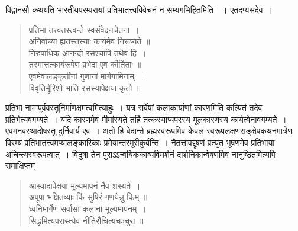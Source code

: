 {\dev विद्वानसौ कथयति भारतीयपरम्परायां प्रतिभातत्त्वविवेचनं न सम्यगभिहितमिति}~{\dev~। एतदप्यसदेव~।}
\begin{quote}
{\dev प्रतिभा तत्त्वतस्त्वन्ते स्वसंवेदनचेतना~।}\\
{\dev अनिर्वाच्या ह्यतस्तस्याः कार्यमेव निरूप्यते ॥}\\[5pt]
{\dev निरुपाधिक आनन्दो रसश्चापि तथैव हि~।}\\
{\dev तस्मात्तत्कार्यरूपेण प्रभेदा एव कीर्तिताः ॥}\\[5pt]
{\dev एवमेवालङ्कृतीनां गुणानां मार्गगामिनाम्~।}\\
{\dev विवृतिर्भूरिशो भाति रसस्यापेक्षया कृतौ ॥}
\end{quote}

{\dev प्रतिभा नामापूर्ववस्तुनिर्माणक्षमत्वमित्याहुः~। यत्र सर्वेषां कलाकार्याणां कारणमिति कल्पितं तदेव प्रतिभेत्यवगम्यते~। यदि कारणमेव मीमांस्यते तर्हि तत्कस्याप्यपरस्य मूलकारणस्य कार्यत्वेनावगम्यते~। एवमनवस्थादोषस्तु दुर्निवार्य एव~। अतो हि वेदान्ते ब्रह्मस्वरूपमिव केवलं स्वरूपलक्षणसङ्क्षेपकथनमात्रेण विरम्य प्रतिभातत्त्वमप्यालङ्कारिकाः प्रमेयान्तरमूरी\-कुर्वन्ति~। नैतत्तावद्दूषणं प्रत्युत भूषणमेव प्रतिभाया अचिन्त्यस्वरूपत्वात्~। विदुषा तेन पुराऽऽन्वयिककाव्यविमर्शनं दार्शनिकान्वेषणमिव नानुष्ठितमित्यपि समाक्षिप्तम्}   
\begin{quote}
{\dev आस्वादापेक्षया मूल्यमापनं नैव शस्यते~।}\\
{\dev अपूपा भक्षितव्याः किं सुषिरं गणयेन्नु किम् ॥}\\[5pt]
{\dev ध्वनिमार्गेण सर्वासां कलानां मूल्यमापनम्~।}\\
{\dev सिद्धमित्यपरास्त्येव नीतिरौचित्यचञ्चुरा ॥}
\end{quote}

